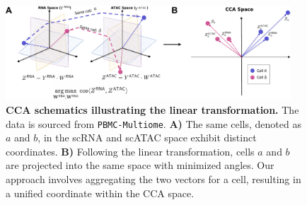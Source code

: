 \begin{figure}[!ht]
    \centering
    \includegraphics[width=0.95\textwidth]{CCA_ADD/fig}
    \vspace{0.1cm}
    \caption[CCA schematic showing the linear transformation.]{\textbf{CCA schematics illustrating the linear transformation.} The data is sourced from \texttt{PBMC-Multiome}. \textbf{A)} The same cells, denoted as $a$ and $b$, in the scRNA and scATAC space exhibit distinct coordinates. \textbf{B)} Following the linear transformation, cells $a$ and $b$ are projected into the same space with minimized angles. Our approach involves aggregating the two vectors for a cell, resulting in a unified coordinate within the CCA space.}
    \label{fig:CCA_ADD}
\end{figure}

